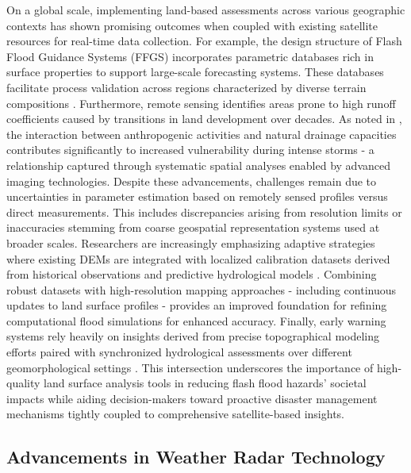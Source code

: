 On a global scale, implementing land-based assessments across various geographic contexts has shown promising outcomes when coupled with existing satellite resources for real-time data collection. For example, the design structure of Flash Flood Guidance Systems (FFGS) incorporates parametric databases rich in surface properties to support large-scale forecasting systems. These databases facilitate process validation across regions characterized by diverse terrain compositions \citep{Georgakakos2022}.
Furthermore, remote sensing identifies areas prone to high runoff coefficients caused by transitions in land development over decades. As noted in \citep{Yang2022}, the interaction between anthropogenic activities and natural drainage capacities contributes significantly to increased vulnerability during intense storms - a relationship captured through systematic spatial analyses enabled by advanced imaging technologies.
Despite these advancements, challenges remain due to uncertainties in parameter estimation based on remotely sensed profiles versus direct measurements. This includes discrepancies arising from resolution limits or inaccuracies stemming from coarse geospatial representation systems used at broader scales. Researchers are increasingly emphasizing adaptive strategies where existing DEMs are integrated with localized calibration datasets derived from historical observations and predictive hydrological models \citep{Msigwa2024}.
Combining robust datasets with high-resolution mapping approaches - including continuous updates to land surface profiles - provides an improved foundation for refining computational flood simulations for enhanced accuracy.
Finally, early warning systems rely heavily on insights derived from precise topographical modeling efforts paired with synchronized hydrological assessments over different geomorphological settings \citep{Henao2022}\citep{Abegaz2024}. This intersection underscores the importance of high-quality land surface analysis tools in reducing flash flood hazards' societal impacts while aiding decision-makers toward proactive disaster management mechanisms tightly coupled to comprehensive satellite-based insights.
\subsection{Advancements in Weather Radar Technology}

